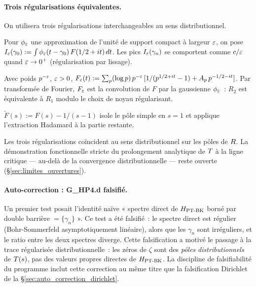 \paragraph{Trois régularisations équivalentes.}
On utilisera trois régularisations interchangeables au sens distributionnel.
\begin{description}[nosep,leftmargin=*]
\item[($R_1$) Smearing par fonction test.] Pour $\phi_\varepsilon$ une approximation
de l'unité de support compact à largeur $\varepsilon$, on pose
$I_\varepsilon(\gamma_0) := \int \phi_\varepsilon(t - \gamma_0)\,F(1/2 + it)\,dt$.
Les pics $I_\varepsilon(\gamma_n)$ se comportent comme $c/\varepsilon$ quand $\varepsilon \to 0^{+}$
(régularisation par lissage).
\item[($R_2$) Sommation Abel-Hadamard.] Avec poids $p^{-\varepsilon}$, $\varepsilon > 0$,
$F_\varepsilon(t) := \sum_p (\log p)\,p^{-\varepsilon}\,[1/(p^{1/2+it} - 1) + A_p\,p^{-1/2-it}]$.
Par transformée de Fourier, $F_\varepsilon$ est la convolution de $F$ par la
gaussienne $\phi_\varepsilon$~: $R_2$ est équivalente à $R_1$ modulo le choix
de noyau régularisant.
\item[($R_3$) Soustraction du pôle principal.] $\widetilde F(s) := F(s) - 1/(s - 1)$
isole le pôle simple en $s = 1$ et applique l'extraction Hadamard à la
partie restante.
\end{description}

Les trois régularisations coïncident au sens distributionnel sur les
pôles de $R$. La démonstration fonctionnelle stricte du prolongement
analytique de $T$ à la ligne critique --- au-delà de la convergence
distributionnelle --- reste ouverte (\S\ref{sec:limites_ouvertures}).

\paragraph{Auto-correction : G\_HP4.d falsifié.}
Un premier test posait l'identité naïve « spectre direct de $H_{\mathrm{PT\text{-}BK}}$
borné par double barrière $= \{\gamma_n\}$ ». Ce test a été
falsifié~: le spectre direct est régulier (Bohr-Sommerfeld
asymptotiquement linéaire), alors que les $\gamma_n$ sont irréguliers, et
le ratio entre les deux spectres diverge. Cette falsification a motivé
le passage à la trace régularisée distributionnelle~: les zéros de
$\zeta$ sont des \emph{pôles distributionnels} de $T(s)$, pas des
valeurs propres directes de $H_{\mathrm{PT\text{-}BK}}$. La discipline de falsifiabilité du
programme inclut cette correction au même titre que la falsification
Dirichlet de la \S\ref{sec:auto_correction_dirichlet}.

